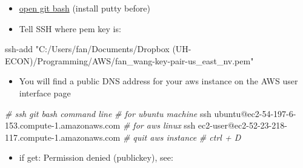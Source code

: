 \documentclass[
]{book}
\newenvironment{Shaded}{\begin{snugshade}}{\end{snugshade}}
\newcommand{\BuiltInTok}[1]{#1}
\newcommand{\CommentTok}[1]{\textcolor[rgb]{0.56,0.35,0.01}{\textit{#1}}}
\newcommand{\FunctionTok}[1]{\textcolor[rgb]{0.00,0.00,0.00}{#1}}
\newcommand{\NormalTok}[1]{#1}
\newcommand{\StringTok}[1]{\textcolor[rgb]{0.31,0.60,0.02}{#1}}
\newcommand{\VariableTok}[1]{\textcolor[rgb]{0.00,0.00,0.00}{#1}}
\providecommand{\tightlist}{%
  \setlength{\itemsep}{0pt}\setlength{\parskip}{0pt}}
\begin{document}
\begin{enumerate}
  \begin{itemize}
  \tightlist
  \item
    \href{https://stackoverflow.com/questions/18683092/how-to-run-ssh-add-on-windows}{open git bash} (install putty before)
  \end{itemize}

\begin{Shaded}
\end{Shaded}

  \begin{itemize}
  \tightlist
  \item
    Tell SSH where pem key is:
  \end{itemize}

\begin{Shaded}
\begin{Highlighting}[]
\FunctionTok{ssh-add} \StringTok{"C:/Users/fan/Documents/Dropbox (UH-ECON)/Programming/AWS/fan_wang-key-pair-us_east_nv.pem"}
\end{Highlighting}
\end{Shaded}

  \begin{itemize}
  \tightlist
  \item
    You will find a public DNS address for your aws instance on the AWS user interface page
  \end{itemize}

\begin{Shaded}
\begin{Highlighting}[]
\CommentTok{# ssh git bash command line}
\CommentTok{# for ubuntu machine}
\FunctionTok{ssh}\NormalTok{ ubuntu@ec2-54-197-6-153.compute-1.amazonaws.com}
\CommentTok{# for aws linux}
\FunctionTok{ssh}\NormalTok{ ec2-user@ec2-52-23-218-117.compute-1.amazonaws.com}
\CommentTok{# quit aws instance}
\CommentTok{# ctrl + D}
\end{Highlighting}
\end{Shaded}

  \begin{itemize}
  \tightlist
  \item
    if get: Permission denied (publickey), see:


\end{itemize}
\end{enumerate}
\end{document}
